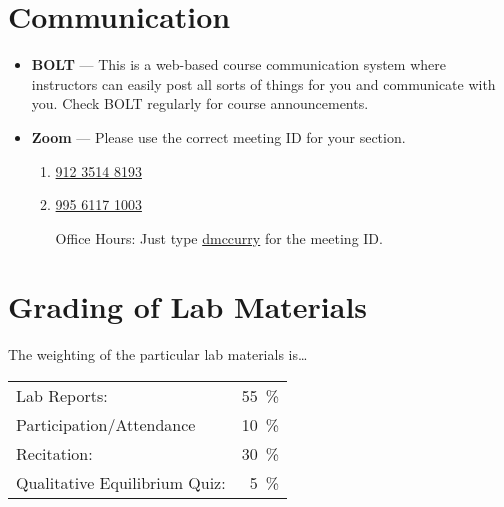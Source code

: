\documentclass[10pt,letterpaper]{article}
\begin{document}
\section*{Communication}
\begin{itemize}[noitemsep]
	\item \textbf{BOLT} --- This is a web-based course communication system
		where instructors can easily post all sorts of things for you
		and communicate with you. Check BOLT regularly for course
		announcements.
	\item \textbf{Zoom} --- Please use the correct meeting ID for your
		section.
		\begin{enumerate}[label={Section \Alph*:},leftmargin=1.25in]
			\item \href{https://bloomu.zoom.us/j/91235148193}{912 3514 8193}
			\item \href{https://bloomu.zoom.us/j/99561171003}{995 6117 1003}
			\item[Office Hours:] Just type 
				\href{https://bloomu.zoom.us/my/dmccurry}{dmccurry}
				for the meeting ID.
		\end{enumerate}
\end{itemize}

\section*{Grading of Lab Materials}
The weighting of the particular lab materials is\ldots

{\renewcommand\arraystretch{1.5}
\begin{tabular} {lr<{\,\%}}
	Lab Reports: & 55 \\
	Participation/Attendance & 10 \\ 
	Recitation: & 30 \\
	Qualitative Equilibrium Quiz: & 5
\end{tabular}
}
\end{document}
